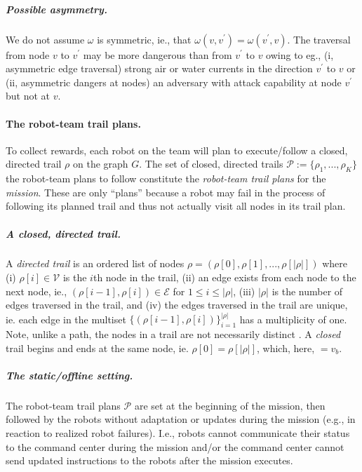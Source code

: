 \documentclass[11pt, oneside]{article}
\begin{document}
\vspace{-\baselineskip}
\subparagraph{Possible asymmetry.} We do not assume $\omega$ is symmetric, ie., that $\omega(v, v^\prime) = \omega(v^\prime, v)$. The traversal from node $v$ to $v^\prime$ may be more dangerous than from $v^\prime$ to $v$ owing to eg., (i, asymmetric edge traversal) strong air or water currents in the direction $v^\prime$ to $v$ or (ii, asymmetric dangers at nodes) an adversary with attack capability at node $v^\prime$ but not at $v$. %

\paragraph{The robot-team trail plans.}
To collect rewards, each robot on the team will plan to execute/follow a closed, directed trail $\rho$ on the graph $G$.  
The set of closed, directed trails $\mathcal{P}:=\{\rho_1, ..., \rho_K\}$ the robot-team plans to follow constitute the \emph{robot-team trail plans} for the \emph{mission}. These are only ``plans'' because a robot may fail in the process of following its planned trail and thus not actually visit all nodes in its trail plan.

\vspace{-\baselineskip}
\subparagraph{A closed, directed trail.} 
A \emph{directed trail} is an ordered list of nodes $\rho = (\rho[0], \rho[1], ..., \rho[\lvert \rho \rvert])$ where
(i) $\rho[i] \in \mathcal{V}$ is the $i$th node in the trail,  
(ii) an edge exists from each node to the next node, ie., $(\rho[i-1], \rho[i])\in\mathcal{E}$ for $1 \leq i  \leq \lvert \rho \rvert$,
(iii) $\lvert \rho \rvert$ is the number of edges traversed in the trail,
and
(iv) the edges traversed in the trail are unique, ie. each edge in the multiset $\{(\rho[i-1], \rho[i])\}_{i=1}^{\lvert \rho \rvert}$ has a multiplicity of one.
Note, unlike a path, the nodes in a trail are not necessarily distinct \cite{wilson1979introduction}.
A \emph{closed} trail begins and ends at the same node, ie. $\rho [0]=\rho[\lvert \rho \rvert]$, which, here, $=v_b$.

\vspace{-\baselineskip}
\subparagraph{The static/offline setting.} 
The robot-team trail plans $\mathcal{P}$ are set at the beginning of the mission, then followed by the robots without adaptation or updates during the mission (e.g., in reaction to realized robot failures). 
I.e., robots cannot communicate their status to the command center during the mission and/or the command center cannot send updated instructions to the robots after the mission executes.
\end{document}
